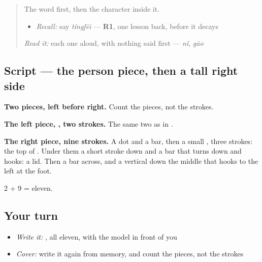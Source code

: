 \label{lesson:ZH-W418-ting-stop}



\begin{quote}
The word first, then the character inside it.

\begin{itemize}
\raggedright
  \item \emph{Recall:} say \emph{tíngfēi} — \textbf{R1}, one lesson back, before it decays
\end{itemize}

\begin{quote}
 
\end{quote}

\emph{Read it:} each one aloud, with nothing said first — \emph{nǐ}, \emph{gāo}
\end{quote}

\subsection*{Script — the person piece, then a tall right side}

\begin{quote}
\end{quote}

\textbf{Two pieces, left before right.} Count the pieces, not the strokes.

\textbf{The left piece, , two strokes.} The same two as in .

\textbf{The right piece, nine strokes.} A dot and a bar, then a small , three strokes: the top of . Under them a short stroke down and a bar that turns down and hooks: a lid. Then a bar across, and a vertical down the middle that hooks to the left at the foot.

2 + 9 = eleven.

\subsection*{Your turn}
\begin{itemize}
\raggedright
  \item \emph{Write it:} , all eleven, with the model in front of you
  \item \emph{Cover:} write it again from memory, and count the pieces, not the strokes
\end{itemize}

